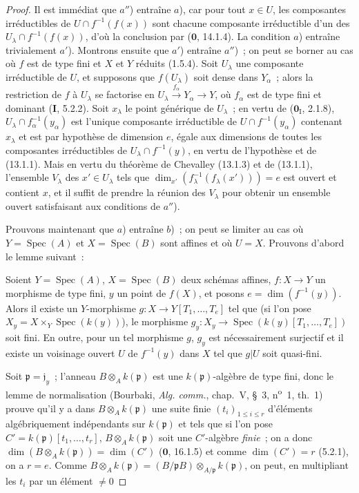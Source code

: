 \begin{proof}
Il est immédiat que $a''$) entraîne $a$), car pour tout $x\in U$, les
composantes irréductibles de $U\cap f^{-1}(f(x))$ sont chacune composante
irréductible d'un des $U_\lambda\cap f^{-1}(f(x))$, d'où la conclusion par
($\mathbf 0$, 14.1.4). La condition $a$) entraîne trivialement $a'$).
Montrons ensuite que $a'$) entraîne $a''$)~; on peut se borner au cas où $f$
est de type fini et $X$ et $Y$ réduits (1.5.4). Soit $U_\lambda$ une
composante irréductible de $U$, et supposons que $f(U_\lambda)$ soit dense
dans $Y_\alpha$~; alors la restriction de $f$ à $U_\lambda$ se factorise en
$U_\lambda\xrightarrow{f_\alpha}Y_\alpha\to Y$, où $f_\alpha$ est de type
fini et dominant (\textbf{I}, 5.2.2). Soit $x_\lambda$ le point générique de
$U_\lambda$~; en vertu de ($\mathbf 0_{\mathrm I}$, 2.1.8),
$U_\lambda\cap f_\alpha^{-1}(y_\alpha)$ est l'unique composante irréductible
de $U\cap f^{-1}(y_\alpha)$ contenant $x_\lambda$ et est par hypothèse de
dimension $e$, égale aux dimensions de toutes les composantes irréductibles
de $U_\lambda\cap f^{-1}(y)$, en vertu de l'hypothèse et de (13.1.1). Mais en
vertu du théorème de Chevalley (13.1.3) et de (13.1.1), l'ensemble $V_\lambda$
des $x'\in U_\lambda$ tels que
$\dim_{x'}(f_\lambda^{-1}(f_\lambda(x')))=e$ est ouvert et contient $x$, et il
suffit de prendre la réunion des $V_\lambda$ pour obtenir un ensemble ouvert
satisfaisant aux conditions de $a''$).

Prouvons maintenant que $a$) entraîne $b$)~; on peut se limiter au cas où
$Y=\operatorname{Spec}(A)$ et $X=\operatorname{Spec}(B)$ sont affines et où
$U=X$. Prouvons d'abord le lemme suivant~:

\begin{lemma}[13.3.1.1]
\label{IV.13.3.1.1-fr}
Soient $Y=\operatorname{Spec}(A)$, $X=\operatorname{Spec}(B)$ deux schémas
affines, $f:X\to Y$ un morphisme de type fini, $y$ un point de $f(X)$, et
posons $e=\dim(f^{-1}(y))$. Alors il existe un $Y$-morphisme
$g:X\to Y[T_1,\ldots,T_e]$ tel que (si l'on pose
$X_y=X\times_Y\operatorname{Spec}(k(y))$), le morphisme
$g_y:X_y\to\operatorname{Spec}(k(y)[T_1,\ldots,T_e])$ soit fini. En outre,
pour un tel morphisme $g$, $g_y$ est nécessairement surjectif et il existe un
voisinage ouvert $U$ de $f^{-1}(y)$ dans $X$ tel que $g|U$ soit quasi-fini.
\end{lemma}

Soit $\mathfrak p=\mathfrak j_y$~; l'anneau $B\otimes_Ak(\mathfrak p)$ est une
$k(\mathfrak p)$-algèbre de type fini, donc le lemme de normalisation
(Bourbaki, \emph{Alg. comm.}, chap.~V, \S~3, n\textsuperscript{o}~1, th.~1)
prouve qu'il y a dans $B\otimes_Ak(\mathfrak p)$ une suite finie
$(t_i)_{1\leq i\leq r}$ d'éléments algébriquement indépendants sur
$k(\mathfrak p)$ et tels que si l'on pose
$C'=k(\mathfrak p)[t_1,\ldots,t_r]$, $B\otimes_Ak(\mathfrak p)$ soit une
$C'$-algèbre \emph{finie}~; on a donc
$\dim(B\otimes_Ak(\mathfrak p))=\dim(C')$ ($\mathbf 0$, 16.1.5) et comme
$\dim(C')=r$ (5.2.1), on a $r=e$. Comme
$B\otimes_Ak(\mathfrak p)=(B/\mathfrak pB)\otimes_{A/\mathfrak p}k(\mathfrak p)$,
on peut, en multipliant les $t_i$ par un élément $\neq0$


\end{proof}
